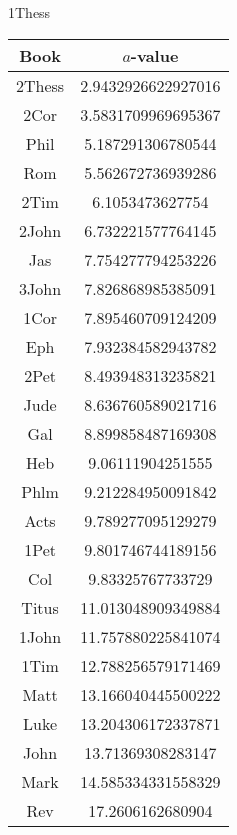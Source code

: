 \documentclass[12pt,letterpaper]{article}
\begin{document}
1Thess
\begin{longtable}{|c|c|}
\hline
 Book & $a$-value \\ \hline
2Thess & 2.9432926622927016 \\ \hline
 2Cor & 3.5831709969695367 \\ \hline
 Phil & 5.187291306780544 \\ \hline
 Rom & 5.562672736939286 \\ \hline
 2Tim & 6.1053473627754 \\ \hline
 2John & 6.732221577764145 \\ \hline
 Jas & 7.754277794253226 \\ \hline
 3John & 7.826868985385091 \\ \hline
 1Cor & 7.895460709124209 \\ \hline
 Eph & 7.932384582943782 \\ \hline
 2Pet & 8.493948313235821 \\ \hline
 Jude & 8.636760589021716 \\ \hline
 Gal & 8.899858487169308 \\ \hline
 Heb & 9.06111904251555 \\ \hline
 Phlm & 9.212284950091842 \\ \hline
 Acts & 9.789277095129279 \\ \hline
 1Pet & 9.801746744189156 \\ \hline
 Col & 9.83325767733729 \\ \hline
 Titus & 11.013048909349884 \\ \hline
 1John & 11.757880225841074 \\ \hline
 1Tim & 12.788256579171469 \\ \hline
 Matt & 13.166040445500222 \\ \hline
 Luke & 13.204306172337871 \\ \hline
 John & 13.71369308283147 \\ \hline
 Mark & 14.585334331558329 \\ \hline
 Rev & 17.2606162680904 \\ \hline 
\end{longtable}
\end{document}
